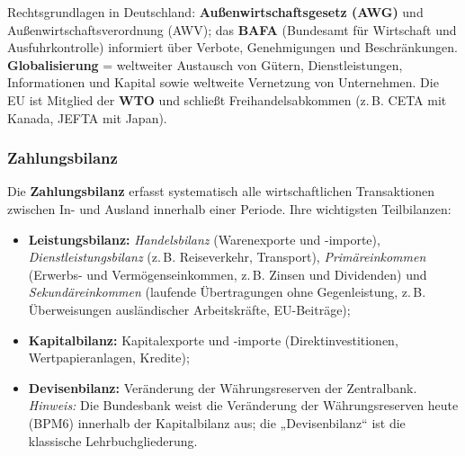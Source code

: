 \documentclass[11pt, a4paper]{article}
\begin{document}
\begin{merksatz}
Rechtsgrundlagen in Deutschland: \textbf{Außenwirtschaftsgesetz (AWG)} und
Außenwirtschaftsverordnung (AWV); das \textbf{BAFA} (Bundesamt für Wirtschaft und
Ausfuhrkontrolle) informiert über Verbote, Genehmigungen und Beschränkungen.
\textbf{Globalisierung} = weltweiter Austausch von Gütern, Dienstleistungen, Informationen
und Kapital sowie weltweite Vernetzung von Unternehmen. Die EU ist Mitglied der
\textbf{WTO} und schließt Freihandelsabkommen (z.\,B. CETA mit Kanada, JEFTA mit Japan).
\end{merksatz}

\subsubsection{Zahlungsbilanz}

Die \textbf{Zahlungsbilanz} erfasst systematisch alle wirtschaftlichen Transaktionen
zwischen In- und Ausland innerhalb einer Periode. Ihre wichtigsten Teilbilanzen:

\begin{itemize}
  \item \textbf{Leistungsbilanz:} \emph{Handelsbilanz} (Warenexporte und -importe),
    \emph{Dienstleistungsbilanz} (z.\,B. Reiseverkehr, Transport),
    \emph{Primäreinkommen} (Erwerbs- und Vermögenseinkommen, z.\,B. Zinsen und
    Dividenden) und \emph{Sekundäreinkommen} (laufende Übertragungen ohne Gegenleistung,
    z.\,B. Überweisungen ausländischer Arbeitskräfte, EU-Beiträge);
  \item \textbf{Kapitalbilanz:} Kapitalexporte und -importe (Direktinvestitionen,
    Wertpapieranlagen, Kredite);
  \item \textbf{Devisenbilanz:} Veränderung der Währungsreserven der Zentralbank.
    \emph{Hinweis:} Die Bundesbank weist die Veränderung der Währungsreserven heute
    (BPM6) innerhalb der Kapitalbilanz aus; die „Devisenbilanz`` ist die klassische
    Lehrbuchgliederung.
\end{itemize}
\end{document}
